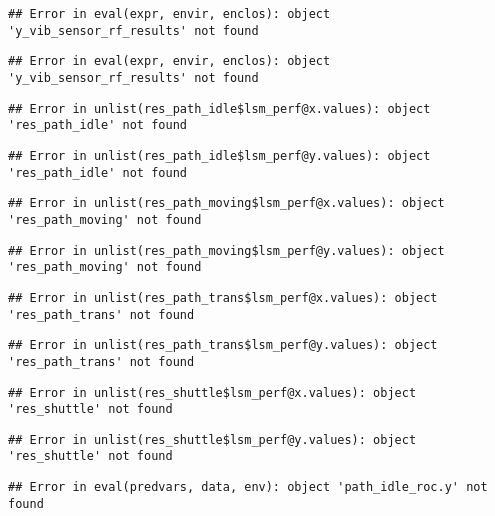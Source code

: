 \documentclass[]{article}
\begin{document}
\begin{verbatim}
## Error in eval(expr, envir, enclos): object 'y_vib_sensor_rf_results' not found
\end{verbatim}

\begin{verbatim}
## Error in eval(expr, envir, enclos): object 'y_vib_sensor_rf_results' not found
\end{verbatim}

\begin{verbatim}
## Error in unlist(res_path_idle$lsm_perf@x.values): object 'res_path_idle' not found
\end{verbatim}

\begin{verbatim}
## Error in unlist(res_path_idle$lsm_perf@y.values): object 'res_path_idle' not found
\end{verbatim}

\begin{verbatim}
## Error in unlist(res_path_moving$lsm_perf@x.values): object 'res_path_moving' not found
\end{verbatim}

\begin{verbatim}
## Error in unlist(res_path_moving$lsm_perf@y.values): object 'res_path_moving' not found
\end{verbatim}

\begin{verbatim}
## Error in unlist(res_path_trans$lsm_perf@x.values): object 'res_path_trans' not found
\end{verbatim}

\begin{verbatim}
## Error in unlist(res_path_trans$lsm_perf@y.values): object 'res_path_trans' not found
\end{verbatim}

\begin{verbatim}
## Error in unlist(res_shuttle$lsm_perf@x.values): object 'res_shuttle' not found
\end{verbatim}

\begin{verbatim}
## Error in unlist(res_shuttle$lsm_perf@y.values): object 'res_shuttle' not found
\end{verbatim}

\begin{verbatim}
## Error in eval(predvars, data, env): object 'path_idle_roc.y' not found
\end{verbatim}
\end{document}
